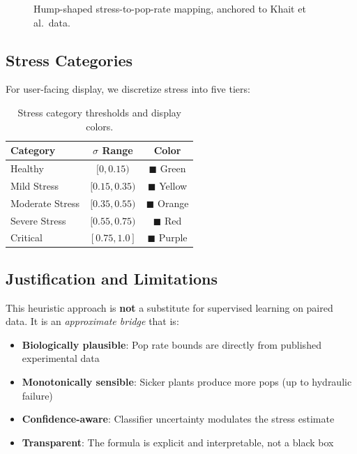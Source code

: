 \documentclass[11pt,a4paper,twocolumn]{article}
\begin{document}
\begin{figure}[H]
    \centering
    \caption{Hump-shaped stress-to-pop-rate mapping, anchored to Khait et al.\ data.}
    \label{fig:pop_curve}
\end{figure}

\subsection{Stress Categories}

For user-facing display, we discretize stress into five tiers:

\begin{table}[H]
\centering
\caption{Stress category thresholds and display colors.}
\label{tab:categories}
\begin{tabular}{@{}lcc@{}}
\toprule
\textbf{Category} & \textbf{$\sigma$ Range} & \textbf{Color} \\
\midrule
Healthy & $[0, 0.15)$ & \textcolor[HTML]{2ECC71}{$\blacksquare$} Green \\
Mild Stress & $[0.15, 0.35)$ & \textcolor[HTML]{F1C40F}{$\blacksquare$} Yellow \\
Moderate Stress & $[0.35, 0.55)$ & \textcolor[HTML]{E67E22}{$\blacksquare$} Orange \\
Severe Stress & $[0.55, 0.75)$ & \textcolor[HTML]{E74C3C}{$\blacksquare$} Red \\
Critical & $[0.75, 1.0]$ & \textcolor[HTML]{8E44AD}{$\blacksquare$} Purple \\
\bottomrule
\end{tabular}
\end{table}

\subsection{Justification and Limitations}

This heuristic approach is \textbf{not} a substitute for supervised learning on paired data. It is an \emph{approximate bridge} that is:

\begin{itemize}[nosep]
    \item \textbf{Biologically plausible}: Pop rate bounds are directly from published experimental data
    \item \textbf{Monotonically sensible}: Sicker plants produce more pops (up to hydraulic failure)
    \item \textbf{Confidence-aware}: Classifier uncertainty modulates the stress estimate
    \item \textbf{Transparent}: The formula is explicit and interpretable, not a black box
\end{itemize}
\end{document}
